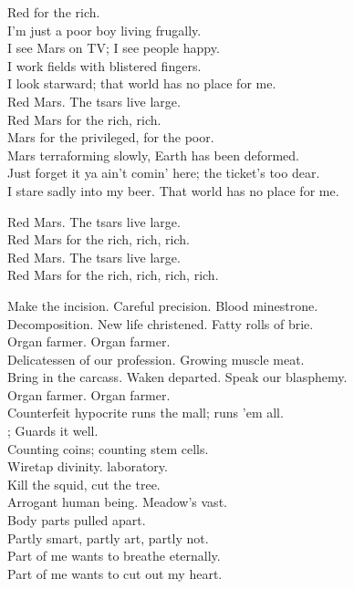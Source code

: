 
Red  for the rich.\\

I'm just a poor boy living frugally.\\
I see Mars on TV; I see people happy. \\
I work fields with blistered fingers. \\
I look starward; that world has no place for me. \\

Red Mars. The tsars live large. \\
Red Mars for the rich, rich. \\

Mars for the privileged,  for the poor. \\
Mars terraforming slowly, Earth has been deformed. \\
Just forget it ya ain't comin' here; the ticket's too dear. \\
I stare sadly into my beer. That world has no place for me.

Red Mars. The tsars live large. \\
Red Mars for the rich, rich, rich. \\
Red Mars. The tsars live large. \\
Red Mars for the rich, rich, rich, rich. \\




Make the incision. Careful precision. Blood minestrone. \\
Decomposition. New life christened. Fatty rolls of brie. \\

Organ farmer. Organ farmer. \\

Delicatessen of our profession. Growing muscle meat. \\
Bring in the carcass. Waken departed. Speak our blasphemy. \\

Organ farmer. Organ farmer. \\

Counterfeit hypocrite runs the mall; runs 'em all. \\
; Guards it well. \\
Counting coins; counting stem cells. \\
Wiretap divinity.  laboratory. \\
Kill the squid, cut the tree. \\
Arrogant human being. Meadow's vast. \\
Body parts pulled apart. \\
Partly smart, partly art, partly not. \\
Part of me wants to breathe eternally. \\
Part of me wants to cut out my heart. \\

